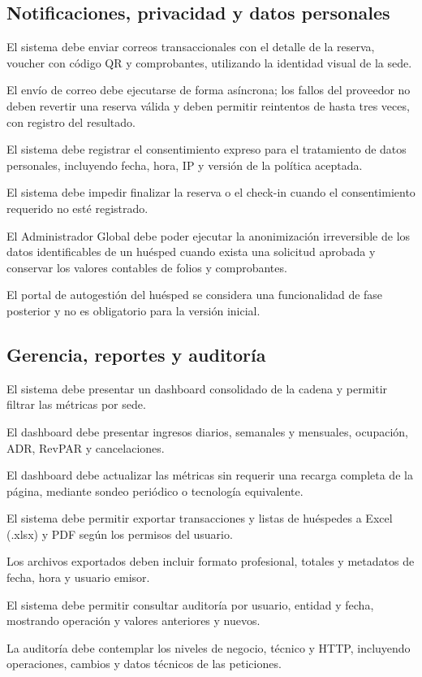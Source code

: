 \documentclass[12pt,a4paper]{article}
\newcommand{\RF}[2]{\item[\textbf{#1}] #2}
\begin{document}
\subsection{Notificaciones, privacidad y datos personales}
\begin{description}[leftmargin=2.1cm,style=nextline]
  \RF{RF-43}{El sistema debe enviar correos transaccionales con el detalle de la reserva, voucher con código QR y comprobantes, utilizando la identidad visual de la sede.}
  \RF{RF-44}{El envío de correo debe ejecutarse de forma asíncrona; los fallos del proveedor no deben revertir una reserva válida y deben permitir reintentos de hasta tres veces, con registro del resultado.}
  \RF{RF-45}{El sistema debe registrar el consentimiento expreso para el tratamiento de datos personales, incluyendo fecha, hora, IP y versión de la política aceptada.}
  \RF{RF-46}{El sistema debe impedir finalizar la reserva o el check-in cuando el consentimiento requerido no esté registrado.}
  \RF{RF-47}{El Administrador Global debe poder ejecutar la anonimización irreversible de los datos identificables de un huésped cuando exista una solicitud aprobada y conservar los valores contables de folios y comprobantes.}
  \RF{RF-48}{El portal de autogestión del huésped se considera una funcionalidad de fase posterior y no es obligatorio para la versión inicial.}
\end{description}

\subsection{Gerencia, reportes y auditoría}
\begin{description}[leftmargin=2.1cm,style=nextline]
  \RF{RF-49}{El sistema debe presentar un dashboard consolidado de la cadena y permitir filtrar las métricas por sede.}
  \RF{RF-50}{El dashboard debe presentar ingresos diarios, semanales y mensuales, ocupación, ADR, RevPAR y cancelaciones.}
  \RF{RF-51}{El dashboard debe actualizar las métricas sin requerir una recarga completa de la página, mediante sondeo periódico o tecnología equivalente.}
  \RF{RF-52}{El sistema debe permitir exportar transacciones y listas de huéspedes a Excel (.xlsx) y PDF según los permisos del usuario.}
  \RF{RF-53}{Los archivos exportados deben incluir formato profesional, totales y metadatos de fecha, hora y usuario emisor.}
  \RF{RF-54}{El sistema debe permitir consultar auditoría por usuario, entidad y fecha, mostrando operación y valores anteriores y nuevos.}
  \RF{RF-55}{La auditoría debe contemplar los niveles de negocio, técnico y HTTP, incluyendo operaciones, cambios y datos técnicos de las peticiones.}
\end{description}
\end{document}

